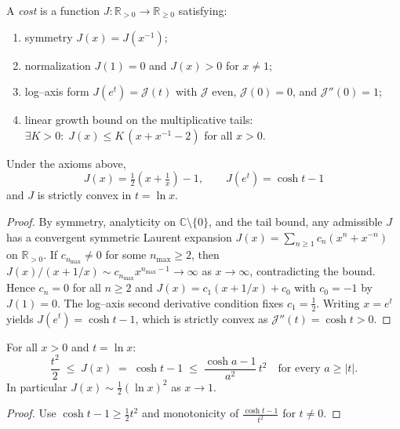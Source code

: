 \documentclass[11pt]{article}
\begin{document}
\begin{definition}
A \emph{cost} is a function \(J:\mathbb R_{>0}\!\to\mathbb R_{\ge0}\) satisfying:
\begin{enumerate}
  \item symmetry \(J(x)=J(x^{-1})\);
  \item normalization \(J(1)=0\) and \(J(x)>0\) for \(x\neq 1\);
  \item log–axis form \(J(e^{t})=\mathcal J(t)\) with \(\mathcal J\) even, \(\mathcal J(0)=0\), and \(\mathcal J''(0)=1\);
  \item linear growth bound on the multiplicative tails:
  \(\displaystyle \exists K>0:\; J(x)\le K\,(x+x^{-1}-2)\) for all \(x>0\).
\end{enumerate}
\end{definition}

\begin{theorem}
\label{thm:J-unique}
Under the axioms above,
\[
\boxed{\; J(x)=\tfrac12\!\left(x+\tfrac1x\right)-1,\qquad
       J(e^{t})=\cosh t-1\;}
\]
and \(J\) is strictly convex in \(t=\ln x\).
\end{theorem}

\begin{proof}
By symmetry, analyticity on \(\mathbb C\!\setminus\!\{0\}\), and the tail bound, any admissible \(J\) has a convergent symmetric Laurent expansion \(J(x)=\sum_{n\ge1} c_n(x^n+x^{-n})\) on \(\mathbb R_{>0}\). If \(c_{n_{\max}}\neq 0\) for some \(n_{\max}\ge2\), then \(J(x)/(x+1/x)\sim c_{n_{\max}}x^{n_{\max}-1}\to\infty\) as \(x\to\infty\), contradicting the bound. Hence \(c_n=0\) for all \(n\ge2\) and \(J(x)=c_1(x+1/x)\!+\!c_0\) with \(c_0=-1\) by \(J(1)=0\). The log–axis second derivative condition fixes \(c_1=\tfrac12\). Writing \(x=e^{t}\) yields \(J(e^{t})=\cosh t-1\), which is strictly convex as \(\mathcal J''(t)=\cosh t>0\).
\end{proof}

\begin{proposition}
\label{prop:J-ineq}
For all \(x>0\) and \(t=\ln x\):
\[
\frac{t^{2}}{2}\;\le\; J(x)\;=\;\cosh t-1\;\le\; \frac{\cosh a -1}{a^{2}}\,t^{2}
\quad\text{for every }a\ge|t|.
\]
In particular \(J(x)\sim \tfrac12(\ln x)^{2}\) as \(x\to1\).
\end{proposition}

\begin{proof}
Use \(\cosh t-1\ge \tfrac12 t^{2}\) and monotonicity of \(\tfrac{\cosh t-1}{t^{2}}\) for \(t\ne0\).
\end{proof}
\end{document}
